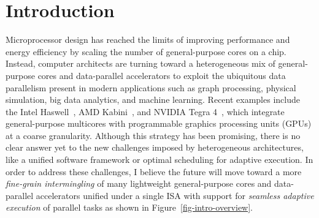 
\section{Introduction}
\label{sec-intro}

\begin{figure}[b]
  \begin{minipage}[b]{0.42\tw}
    
  \end{minipage}%
  \hfill%
  \begin{minipage}[b]{0.56\tw}
    
  \end{minipage}
\end{figure}

Microprocessor design has reached the limits of improving performance and
energy efficiency by scaling the number of general-purpose cores on a
chip. Instead, computer architects are turning toward a heterogeneous mix
of general-purpose cores and data-parallel accelerators to exploit the
ubiquitous data parallelism present in modern applications such as graph
processing, physical simulation, big data analytics, and machine
learning. Recent examples include the Intel
Haswell~\cite{hammarlund-intel-haswell-ieeemicro2014}, AMD
Kabini~\cite{bouvier-amd-kabini-ieeemicro2014}, and NVIDIA Tegra
4~\cite{krewell-nvidia-tegra4-mpr2013}, which integrate general-purpose
multicores with programmable graphics processing units (GPUs) at a coarse
granularity. Although this strategy has been promising, there is no clear
answer yet to the new challenges imposed by heterogeneous architectures,
like a unified software framework or optimal scheduling for adaptive
execution. In order to address these challenges, I believe the future
will move toward a more \emph{fine-grain intermingling} of many
lightweight general-purpose cores and data-parallel accelerators unified
under a single ISA with support for \emph{seamless adaptive execution} of
parallel tasks as shown in Figure~\ref{fig-intro-overview}.

